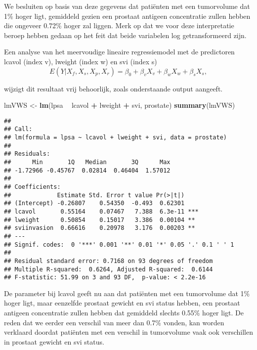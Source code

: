 \documentclass[12pt,dutch,coursenotes]{book}
\newenvironment{Shaded}{\begin{snugshade}}{\end{snugshade}}
\newcommand{\KeywordTok}[1]{\textcolor[rgb]{0.13,0.29,0.53}{\textbf{#1}}}
\newcommand{\StringTok}[1]{\textcolor[rgb]{0.31,0.60,0.02}{#1}}
\newcommand{\OperatorTok}[1]{\textcolor[rgb]{0.81,0.36,0.00}{\textbf{#1}}}
\newcommand{\NormalTok}[1]{#1}
\theoremstyle{definition}
\theoremstyle{definition}
\theoremstyle{definition}
\theoremstyle{remark}
\begin{document}
We besluiten op basis van deze gegevens dat patiënten met een
tumorvolume dat 1\% hoger ligt, gemiddeld gezien een prostaat antigeen
concentratie zullen hebben die ongeveer 0.72\% hoger zal liggen. Merk op
dat we voor deze interpretatie beroep hebben gedaan op het feit dat
beide variabelen log getransformeerd zijn.

Een analyse van het meervoudige lineaire regressiemodel met de
predictoren lcavol (index v), lweight (index w) en svi (index s)
\[E(Y|X_f,X_s,X_p,X_r)=\beta_0 +\beta_v X_v+\beta_w X_w+\beta_s X_s,\]

wijzigt dit resultaat vrij behoorlijk, zoals onderstaande output
aangeeft.

\begin{Shaded}
\begin{Highlighting}[]
\NormalTok{lmVWS <-}\StringTok{ }\KeywordTok{lm}\NormalTok{(lpsa }\OperatorTok{~}\StringTok{ }\NormalTok{lcavol }\OperatorTok{+}\StringTok{ }\NormalTok{lweight }\OperatorTok{+}\StringTok{ }\NormalTok{svi, prostate)}
\KeywordTok{summary}\NormalTok{(lmVWS)}
\end{Highlighting}
\end{Shaded}

\begin{verbatim}
## 
## Call:
## lm(formula = lpsa ~ lcavol + lweight + svi, data = prostate)
## 
## Residuals:
##      Min       1Q   Median       3Q      Max 
## -1.72966 -0.45767  0.02814  0.46404  1.57012 
## 
## Coefficients:
##             Estimate Std. Error t value Pr(>|t|)    
## (Intercept) -0.26807    0.54350  -0.493  0.62301    
## lcavol       0.55164    0.07467   7.388  6.3e-11 ***
## lweight      0.50854    0.15017   3.386  0.00104 ** 
## sviinvasion  0.66616    0.20978   3.176  0.00203 ** 
## ---
## Signif. codes:  0 '***' 0.001 '**' 0.01 '*' 0.05 '.' 0.1 ' ' 1
## 
## Residual standard error: 0.7168 on 93 degrees of freedom
## Multiple R-squared:  0.6264, Adjusted R-squared:  0.6144 
## F-statistic: 51.99 on 3 and 93 DF,  p-value: < 2.2e-16
\end{verbatim}

De parameter bij lcavol geeft nu aan dat patiënten met een tumorvolume
dat 1\% hoger ligt, maar eenzelfde prostaat gewicht en svi status
hebben, een prostaat antigeen concentratie zullen hebben dat gemiddeld
slechts 0.55\% hoger ligt. De reden dat we eerder een verschil van meer
dan 0.7\% vonden, kan worden verklaard doordat patiënten met een
verschil in tumorvolume vaak ook verschillen in prostaat gewicht en svi
status.
\end{document}
